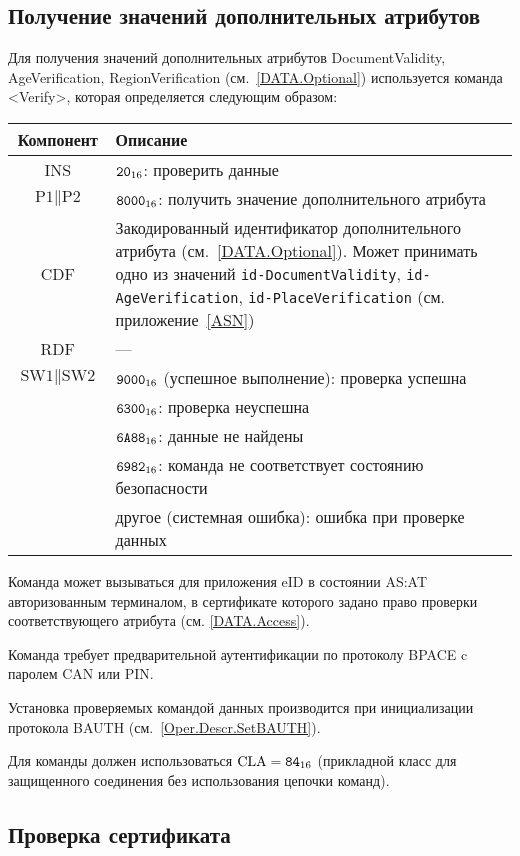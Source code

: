 \subsection{Получение значений дополнительных атрибутов}
\label{Oper.Descr.VerifyData}

Для получения значений дополнительных 
атрибутов DocumentValidity, AgeVerification, RegionVerification 
(см.~\ref{DATA.Optional}) 
используется команда  <Verify>, 
которая определяется следующим образом:

\noindent
\begin{tabular}{|c|p{14cm}|}
\hline
Компонент & Описание \\
\hline
\hline
INS & $\texttt{20}_{16}$: проверить данные\\
\hline
$\text{P1} \parallel \text{P2}$ & $\texttt{8000}_{16}$: 
получить значение дополнительного атрибута\\
\hline
CDF & Закодированный идентификатор дополнительного атрибута 
(см.~\ref{DATA.Optional}). 
Может принимать одно из значений 
\verb|id-DocumentValidity|, \verb|id-AgeVerification|, \verb|id-PlaceVerification| 
(см. приложение~\ref{ASN})\\
\hline \hline
RDF &  --- \\
\hline
$\text{SW1} \parallel \text{SW2}$ & $\texttt{9000}_{16}$ 
(успешное выполнение): проверка успешна\\
 & $\texttt{6300}_{16}$: проверка неуспешна\\
 & $\texttt{6A88}_{16}$: данные не найдены \\
 & $\texttt{6982}_{16}$: команда не соответствует состоянию безопасности\\
 & другое (системная ошибка): ошибка при проверке данных\\
\hline
\end{tabular}

Команда может вызываться для приложения eID в состоянии AS:AT
авторизованным терминалом, в сертификате которого задано право
проверки соответствующего атрибута (см. \ref{DATA.Access}).  

Команда требует предварительной аутентификации по протоколу BPACE 
c паролем CAN или PIN.

Установка проверяемых командой данных производится 
при инициализации протокола BAUTH (см.~\ref{Oper.Descr.SetBAUTH}).  

Для команды должен использоваться $\text{CLA}=\texttt{84}_{16}$ 
(прикладной класс для защищенного соединения без использования цепочки 
команд). 

\subsection{Проверка сертификата}
\label{Oper.Descr.VerifyCert}


